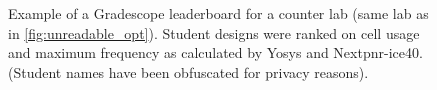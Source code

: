 
\begin{figure}[t]
    \centering
    \caption[
        Gradescope Leaderboard
    ]{
        Example of a Gradescope leaderboard for a counter lab (same lab as in \autoref{fig:unreadable_opt}).
        Student designs were ranked on cell usage and maximum frequency as calculated by Yosys and Nextpnr-ice40.
        (Student names have been obfuscated for privacy reasons).
    }
    \label{fig:leaderboard}
\end{figure}
